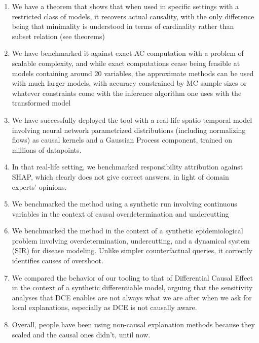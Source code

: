 \documentclass{article}
\begin{document}
\begin{enumerate}
    \begin{enumerate}
        \item We have a theorem that shows that when used in specific settings with a restricted class of models, it recovers actual causality, with the only difference being that minimality is understood in terms of cardinality rather than subset relation (see theorems)
        \item We have benchmarked it against exact AC computation with a problem of scalable complexity, and while exact computations cease being feasible at models containing around 20 variables, the approximate methods can be used with much larger models, with accuracy constrained by MC sample sizes or whatever constraints come with the inference algorithm one uses with the transformed model
        \item We have successfully deployed the tool with a real-life spatio-temporal model involving neural network parametrized distributions (including normalizing flows) as causal kernels and a Gaussian Process component, trained on millions of datapoints.
        \item In that real-life setting, we benchmarked responsibility attribution against SHAP, which clearly does not give correct answers, in light of domain experts' opinions.
        \item We benchmarked the method using a synthetic run involving continuous variables in the context of causal overdetermination and undercutting
        \item We benchmarked the method in the context of a synthetic epidemiological problem involving overdetermination, undercutting, and a dynamical system (SIR) for disease modeling. Unlike simpler counterfactual queries, it correctly identifies causes of overshoot.
        \item We compared the behavior of our tooling to that of Differential Causal Effect in the context of a synthetic differentiable model, arguing that the sensitivity analyses that DCE enables are not always what we are after when we ask for local explanations, especially as DCE is not causally aware.

        \item Overall, people have been using non-causal explanation methods because they scaled and the causal ones didn't, until now.
        
    \end{enumerate}
\end{enumerate}
\end{document}
